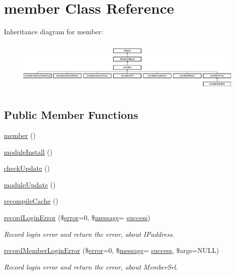 \hypertarget{classmember}{}\section{member Class Reference}
\label{classmember}
Inheritance diagram for member\+:\begin{figure}[H]
\begin{center}
\leavevmode
\includegraphics[height=2.580645cm]{classmember}
\end{center}
\end{figure}
\subsection*{Public Member Functions}
\begin{DoxyCompactItemize}
\item 
\hyperlink{classmember_a4153f13605eac8adf8dde89ee7d18c02}{member} ()
\item 
\hyperlink{classmember_a5834fa338d03eedcb5e84bb8ccac305b}{module\+Install} ()
\item 
\hyperlink{classmember_ad28f96bfab17efa94a9f2607a8b42a3d}{check\+Update} ()
\item 
\hyperlink{classmember_a72b7382e568644ccadb69b67e4504086}{module\+Update} ()
\item 
\hyperlink{classmember_ab5bc32f3821f7cba98e34703679c69ee}{recompile\+Cache} ()
\item 
\hyperlink{classmember_a557d0a329f29c5490a53c6e5a58dcab9}{record\+Login\+Error} (\$\hyperlink{jquery_8js_ad9c7b7332a24ed93fb21cd053c99bd12}{error}=0, \$\hyperlink{classmessage}{message}= \textquotesingle{}\hyperlink{jquery_8oembed_8js_a20d50bae920793dd76c2f5b4c6fd9803}{success}\textquotesingle{})
\begin{DoxyCompactList}\small\item\em Record login error and return the error, about I\+Paddress. \end{DoxyCompactList}\item 
\hyperlink{classmember_a629cfb29393b629f0b39e4467a3d44d4}{record\+Member\+Login\+Error} (\$\hyperlink{jquery_8js_ad9c7b7332a24ed93fb21cd053c99bd12}{error}=0, \$\hyperlink{classmessage}{message}= \textquotesingle{}\hyperlink{jquery_8oembed_8js_a20d50bae920793dd76c2f5b4c6fd9803}{success}\textquotesingle{}, \$args=N\+U\+LL)
\begin{DoxyCompactList}\small\item\em Record login error and return the error, about Member\+Srl. \end{DoxyCompactList}\end{DoxyCompactItemize}
